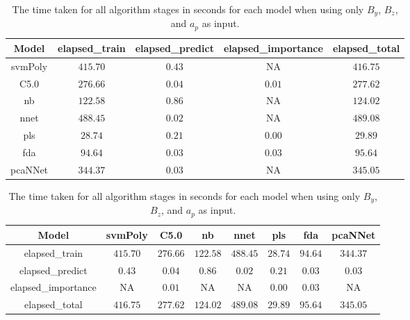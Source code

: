 \begin{table}[!ht]
	\centering
	\begin{tabular}{|c|c|c|c|c|}
		\hline
		Model & elapsed_train & elapsed_predict & elapsed_importance & elapsed_total \\ \hline
		svmPoly & $415.70$ & $0.43$ & NA & $416.75$ \\ \hline
		C5.0 & $276.66$ & $0.04$ & $0.01$ & $277.62$ \\ \hline
		nb & $122.58$ & $0.86$ & NA & $124.02$ \\ \hline
		nnet & $488.45$ & $0.02$ & NA & $489.08$ \\ \hline
		pls & $28.74$ & $0.21$ & $0.00$ & $29.89$ \\ \hline
		fda & $94.64$ & $0.03$ & $0.03$ & $95.64$ \\ \hline
		pcaNNet & $344.37$ & $0.03$ & NA & $345.05$ \\ \hline
	\end{tabular}
	\caption{The time taken for all algorithm stages in seconds for each model when using only $B_{y}$, $B_{z}$, and $a_{p}$ as input.}
	\label{tab:time:yzap}
\end{table}

\begin{table}[!ht]
	\centering
	\begin{tabular}{|c|c|c|c|c|c|c|c|}
		\hline
		Model & svmPoly & C5.0 & nb & nnet & pls & fda & pcaNNet \\ \hline
		elapsed_train & $415.70$ & $276.66$ & $122.58$ & $488.45$ & $28.74$ & $94.64$ & $344.37$ \\ \hline
		elapsed_predict & $0.43$ & $0.04$ & $0.86$ & $0.02$ & $0.21$ & $0.03$ & $0.03$ \\ \hline
		elapsed_importance & NA & $0.01$ & NA & NA & $0.00$ & $0.03$ & NA \\ \hline
		elapsed_total & $416.75$ & $277.62$ & $124.02$ & $489.08$ & $29.89$ & $95.64$ & $345.05$ \\ \hline
	\end{tabular}
	\caption{The time taken for all algorithm stages in seconds for each model when using only $B_{y}$, $B_{z}$, and $a_{p}$ as input.}
	\label{tab:time:reverse:yzap}
\end{table}

